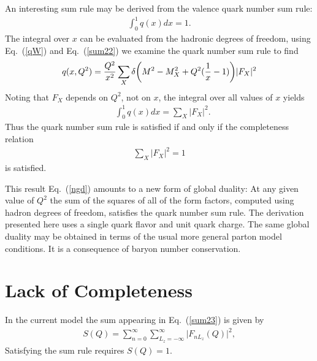 \documentclass[aps,prd,amsmath,longbibliography]{revtex4-1}
\newcommand{\eq}[1]{Eq.~(\ref{#1})}
\def\bea{\begin{eqnarray}}
\def\eea{\end{eqnarray}}\def\a{\alpha}\newcommand{\bfk}{{\bf k}}\newcommand{\bfq}{{\bf q}}
\begin{document}
{%

An interesting sum rule may be derived from the valence  quark number sum rule:
\bea \int_0^1q(x)dx=1.
\eea
The integral over $x$ can be evaluated from the hadronic degrees of freedom, using  \eq{qW} and \eq{sum22} we examine the quark number sum rule 
 to find
\bea q(x,Q^2)={Q^2\over x^2} \sum _{X}\d\bigg(M^2-M_X^2+Q^2({1\over x}-1)\bigg)|F_{X}|^2 \label{qx}\eea
Noting that  $F_X$ depends on $Q^2$, not on $x$, the integral over all values of $x$ yields
\bea& \int_0^1q(x)dx=\sum_X|F_{X}|^2.\label{ngd}\eea
Thus the quark number  sum rule is satisfied if and only if the completeness relation
\bea \sum_X|F_{X}|^2=1\label{sum23}\eea is satisfied. %

This result  \eq{ngd}  amounts to a new form of global duality: At any given value of  $Q^2$ the sum of the squares of all of the form factors, computed using hadron degrees of freedom, satisfies the quark number sum rule. The derivation presented here   uses  a single quark flavor and unit quark charge. The same global duality may be  obtained in terms of the usual more general parton model conditions. It is a consequence of baryon number conservation.\\


 
\section{Lack of Completeness}
In the current model the sum appearing  in \eq{sum23} is given by
\bea S(Q)=\sum_{n=0}^\infty\sum_{L_z=-\infty}^\infty \bigg|F_{nL_z}(Q)\bigg|^2,\label{complete}\eea
Satisfying the  sum rule requires $S(Q)=1$.

}
\end{document}
